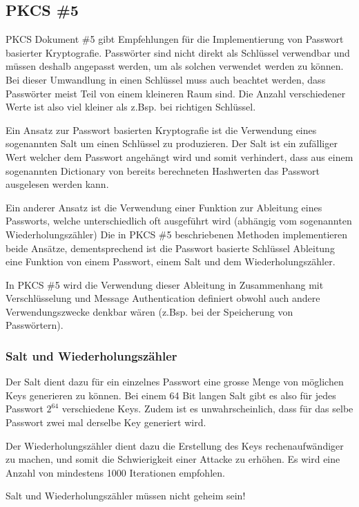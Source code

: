 \documentclass[10pt,a4paper]{article}
\begin{document}
\subsection{PKCS \#5}
PKCS Dokument \#5 gibt Empfehlungen für die Implementierung von Passwort basierter
Kryptografie. Passwörter sind nicht direkt als Schlüssel verwendbar und müssen deshalb
angepasst werden, um als solchen verwendet werden zu können. Bei dieser Umwandlung in
einen Schlüssel muss auch beachtet werden, dass Passwörter meist Teil von einem kleineren
Raum sind. Die Anzahl verschiedener Werte ist also viel kleiner als z.Bsp. bei richtigen
Schlüssel.

Ein Ansatz zur Passwort basierten Kryptografie ist die Verwendung eines sogenannten Salt
um einen Schlüssel zu produzieren. Der Salt ist ein zufälliger Wert welcher dem Passwort
angehängt wird und somit verhindert, dass aus einem sogenannten Dictionary von bereits
berechneten Hashwerten das Passwort ausgelesen werden kann. 

Ein anderer Ansatz ist die Verwendung einer Funktion zur Ableitung eines Passworts, welche
unterschiedlich oft ausgeführt wird (abhängig vom sogenannten Wiederholungszähler) Die in
PKCS \#5 beschriebenen Methoden implementieren beide Ansätze, dementsprechend ist die
Passwort basierte Schlüssel Ableitung eine Funktion von einem Passwort, einem Salt und dem
Wiederholungszähler.

In PKCS \#5 wird die Verwendung dieser Ableitung in Zusammenhang mit Verschlüsselung und
Message Authentication definiert obwohl auch andere Verwendungszwecke denkbar wären
(z.Bsp.  bei der Speicherung von Passwörtern).

\subsubsection{Salt und Wiederholungszähler}
Der Salt dient dazu für ein einzelnes Passwort eine grosse Menge von möglichen Keys
generieren zu können. Bei einem 64 Bit langen Salt gibt es also für jedes Passwort $2^64$
verschiedene Keys. Zudem ist es unwahrscheinlich, dass für das selbe Passwort zwei mal
derselbe Key generiert wird.

Der Wiederholungszähler dient dazu die Erstellung des Keys rechenaufwändiger zu machen,
und somit die Schwierigkeit einer Attacke zu erhöhen. Es wird eine Anzahl von mindestens
1000 Iterationen empfohlen.

Salt und Wiederholungszähler müssen nicht geheim sein!
\end{document}

